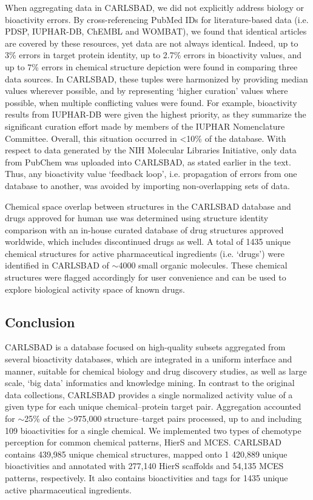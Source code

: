 When aggregating data in CARLSBAD, we did not explicitly address biology or bioactivity errors. By cross-referencing PubMed IDs for literature-based data (i.e. PDSP, IUPHAR-DB, ChEMBL and WOMBAT), we found that identical articles are covered by these resources, yet data are not always identical. Indeed, up to 3\% errors in target protein identity, up to 2.7\% errors in bioactivity values, and up to 7\% errors in chemical structure depiction were found in comparing three data sources. In CARLSBAD, these tuples were harmonized by providing median values wherever possible, and by representing ‘higher curation’ values where possible, when multiple conflicting values were found. For example, bioactivity results from IUPHAR-DB were given the highest priority, as they summarize the significant curation effort made by members of the IUPHAR Nomenclature Committee. Overall, this situation occurred in \textless 10\% of the database. With respect to data generated by the NIH Molecular Libraries Initiative\cite{Austin2004-qc}, only data from PubChem was uploaded into CARLSBAD, as stated earlier in the text. Thus, any bioactivity value ‘feedback loop’, i.e. propagation of errors from one database to another, was avoided by importing non-overlapping sets of data.

Chemical space overlap between structures in the CARLSBAD database and drugs approved for human use was determined using structure identity comparison with an in-house curated database of drug structures approved worldwide, which includes discontinued drugs as well\cite{Oprea2010-kd,Manallack2013-qm}. A total of 1435 unique chemical structures for active pharmaceutical ingredients (i.e. ‘drugs’) were identified in CARLSBAD of $\sim$4000 small organic molecules. These chemical structures were flagged accordingly for user convenience and can be used to explore biological activity space of known drugs.

\subsection{Conclusion}

CARLSBAD is a database focused on high-quality subsets aggregated from several bioactivity databases, which are integrated in a uniform interface and manner, suitable for chemical biology and drug discovery studies, as well as large scale, ‘big data’ informatics and knowledge mining. In contrast to the original data collections, CARLSBAD provides a single normalized activity value of a given type for each unique chemical–protein target pair. Aggregation accounted for $\sim$25\% of the \textgreater 975,000 structure–target pairs processed, up to and including 109 bioactivities for a single chemical. We implemented two types of chemotype perception for common chemical patterns, HierS and MCES. CARLSBAD contains 439,985 unique chemical structures, mapped onto 1 420,889 unique bioactivities and annotated with 277,140 HierS scaffolds and 54,135 MCES patterns, respectively. It also contains bioactivities and tags for 1435 unique active pharmaceutical ingredients.



